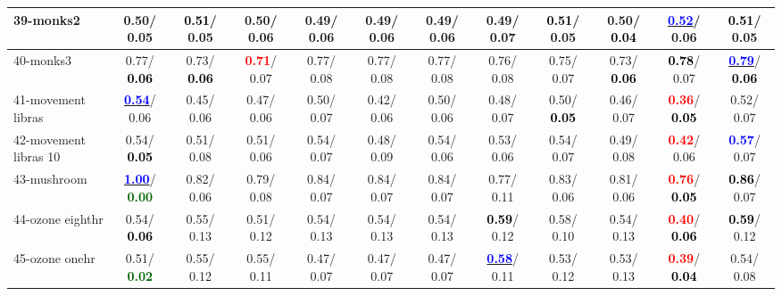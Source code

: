 \begin{table}[h]
\begin{center}
{\begin{tabular}{lc|c|c|c|c|c|c|c|c|c|c}
39-monks2 &   0.50/  0.05 & \textcolor{black}{\textbf{  0.51}}/  0.05 &   0.50/  0.06 &   0.49/  0.06 &   0.49/  0.06 &   0.49/  0.06 &   0.49/  0.07 & \textcolor{black}{\textbf{  0.51}}/  0.05 &   0.50/\textcolor{black}{\textbf{  0.04}} & \underline{\textcolor{blue}{\textbf{  0.52}}}/  0.06 & \textcolor{black}{\textbf{  0.51}}/  0.05 \\ \hline
40-monks3 &   0.77/\textcolor{black}{\textbf{  0.06}} &   0.73/\textcolor{black}{\textbf{  0.06}} & \textcolor{red}{\textbf{  0.71}}/  0.07 &   0.77/  0.08 &   0.77/  0.08 &   0.77/  0.08 &   0.76/  0.08 &   0.75/  0.07 &   0.73/\textcolor{black}{\textbf{  0.06}} & \textcolor{black}{\textbf{  0.78}}/  0.07 & \underline{\textcolor{blue}{\textbf{  0.79}}}/\textcolor{black}{\textbf{  0.06}} \\
41-movement libras & \underline{\textcolor{blue}{\textbf{  0.54}}}/  0.06 &   0.45/  0.06 &   0.47/  0.06 &   0.50/  0.07 &   0.42/  0.06 &   0.50/  0.06 &   0.48/  0.07 &   0.50/\textcolor{black}{\textbf{  0.05}} &   0.46/  0.07 & \textcolor{red}{\textbf{  0.36}}/\textcolor{black}{\textbf{  0.05}} &   0.52/  0.07 \\
42-movement libras 10 &   0.54/\textcolor{black}{\textbf{  0.05}} &   0.51/  0.08 &   0.51/  0.06 &   0.54/  0.07 &   0.48/  0.09 &   0.54/  0.06 &   0.53/  0.06 &   0.54/  0.07 &   0.49/  0.08 & \textcolor{red}{\textbf{  0.42}}/  0.06 & \textcolor{blue}{\textbf{  0.57}}/  0.07 \\
43-mushroom & \underline{\textcolor{blue}{\textbf{  1.00}}}/\textcolor{darkgreen}{\textbf{  0.00}} &   0.82/  0.06 &   0.79/  0.08 &   0.84/  0.07 &   0.84/  0.07 &   0.84/  0.07 &   0.77/  0.11 &   0.83/  0.06 &   0.81/  0.06 & \textcolor{red}{\textbf{  0.76}}/\textcolor{black}{\textbf{  0.05}} & \textcolor{black}{\textbf{  0.86}}/  0.07 \\
44-ozone eighthr &   0.54/\textcolor{black}{\textbf{  0.06}} &   0.55/  0.13 &   0.51/  0.12 &   0.54/  0.13 &   0.54/  0.13 &   0.54/  0.13 & \textcolor{black}{\textbf{  0.59}}/  0.12 &   0.58/  0.10 &   0.54/  0.13 & \textcolor{red}{\textbf{  0.40}}/\textcolor{black}{\textbf{  0.06}} & \textcolor{black}{\textbf{  0.59}}/  0.12 \\
45-ozone onehr &   0.51/\textcolor{darkgreen}{\textbf{  0.02}} &   0.55/  0.12 &   0.55/  0.11 &   0.47/  0.07 &   0.47/  0.07 &   0.47/  0.07 & \underline{\textcolor{blue}{\textbf{  0.58}}}/  0.11 &   0.53/  0.12 &   0.53/  0.13 & \textcolor{red}{\textbf{  0.39}}/\textcolor{black}{\textbf{  0.04}} &   0.54/  0.08 \\

\end{tabular}}
\end{center}
\end{table}
